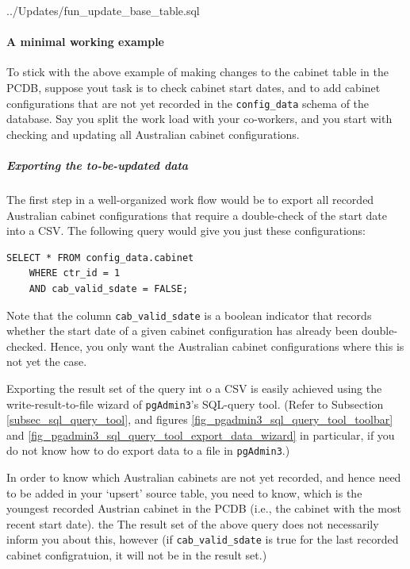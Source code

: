 %
{../Updates/fun_update_base_table.sql}

\paragraph{A minimal working example}\label{par_upsert_minimal_working_example}

To stick with the above example of making changes to the cabinet table in the PCDB, suppose yout task is to check cabinet start dates, and to add cabinet configurations that are not yet recorded in the \texttt{config\_data} schema of the database.
Say you split the work load with your co-workers, and you start with checking and updating all Australian cabinet configurations.

\subparagraph{Exporting the to-be-updated data}
The first step in a well-organized work flow would be to export all recorded Australian cabinet configurations that require a double-check of the start date into a CSV.
The following query would give you just these configurations: 
\begin{lstlisting}[language=postgreSQL]
SELECT * FROM config_data.cabinet 
	WHERE ctr_id = 1
	AND cab_valid_sdate = FALSE;
\end{lstlisting}
Note that the column \texttt{cab\_valid\_sdate} is a boolean indicator that records whether the start date of a given cabinet configuration has already been double-checked. Hence, you only want the Australian cabinet configurations where this is not yet the case.

Exporting the result set of the query int o a CSV is easily achieved using the write-result-to-file wizard of \texttt{pgAdmin3}'s SQL-query tool. (Refer to Subsection \ref{subsec_sql_query_tool}, and figures \ref{fig_pgadmin3_sql_query_tool_toolbar} and \ref{fig_pgadmin3_sql_query_tool_export_data_wizard} in particular, if you do not know how to do export data to a file in \texttt{pgAdmin3}.)

In order to know which Australian cabinets are not yet recorded, and hence need to be added in your `upsert' source table, you need to know, which is the youngest recorded Austrian cabinet in the PCDB (i.e., the cabinet with the most recent start date). 
the The result set of the above query does not necessarily inform you about this,  however (if \texttt{cab\_valid\_sdate} is true for the last recorded cabinet configratuion, it will not be in the result set.)

